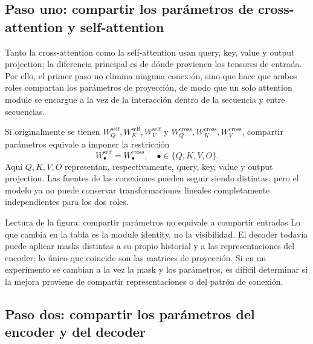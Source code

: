 \subsection{Paso uno: compartir los parámetros de cross-attention y self-attention}

Tanto la cross-attention como la self-attention usan query, key, value y output projection; la diferencia principal es de dónde provienen los tensores de entrada. Por ello, el primer paso no elimina ninguna conexión, sino que hace que ambos roles compartan los parámetros de proyección, de modo que un solo attention module se encargue a la vez de la interacción dentro de la secuencia y entre secuencias.


Si originalmente se tienen $W_Q^{\mathrm{self}},W_K^{\mathrm{self}},W_V^{\mathrm{self}}$ y $W_Q^{\mathrm{cross}},W_K^{\mathrm{cross}},W_V^{\mathrm{cross}}$, compartir parámetros equivale a imponer la restricción
\[
W_{\bullet}^{\mathrm{self}}=W_{\bullet}^{\mathrm{cross}},
\quad \bullet\in\{Q,K,V,O\}.
\]
Aquí $Q,K,V,O$ representan, respectivamente, query, key, value y output projection. Las fuentes de las conexiones pueden seguir siendo distintas, pero el modelo ya no puede conservar transformaciones lineales completamente independientes para los dos roles.


\begin{knowledgebox}{Lectura de la figura: compartir parámetros no equivale a compartir entradas}
Lo que cambia en la tabla es la module identity, no la visibilidad. El decoder todavía puede aplicar masks distintas a su propio historial y a las representaciones del encoder; lo único que coincide son las matrices de proyección. Si en un experimento se cambian a la vez la mask y los parámetros, es difícil determinar si la mejora proviene de compartir representaciones o del patrón de conexión.
\end{knowledgebox}

\subsection{Paso dos: compartir los parámetros del encoder y del decoder}

